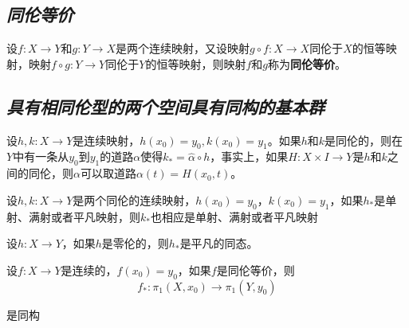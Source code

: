 \subsection*{\textsl{同伦等价}}


\begin{define}
    设$f:X\rightarrow Y$和$g:Y\rightarrow X$是两个连续映射，又设映射$g\circ f:X\rightarrow X$同伦于$X$的恒等映射，映射$f\circ g:Y\rightarrow Y$同伦于$Y$的恒等映射，则映射$f$和$g$称为\textbf{同伦等价}。
\end{define}

\subsection*{\textsl{具有相同伦型的两个空间具有同构的基本群}}

\begin{mdframed}
    \begin{lemma}
        设$h,k:X\rightarrow Y$是连续映射，$h(x_0)=y_0,k(x_0)=y_1$。如果$h$和$k$是同伦的，则在$Y$中有一条从$y_0$到$y_1$的道路$\alpha$使得$k_*=\hat{\alpha}\circ h$，事实上，如果$H:X\times I\rightarrow Y$是$h$和$k$之间的同伦，则$\alpha$可以取道路$\alpha(t)=H(x_0,t)$。
    \end{lemma}
\end{mdframed}

\begin{mdframed}
    \begin{corollary}
            设$h,k:X\rightarrow Y$是两个同伦的连续映射，$h(x_0)=y_0$，$k(x_0)=y_1$，如果$h_*$是单射、满射或者平凡映射，则$k_*$也相应是单射、满射或者平凡映射
    \end{corollary}
\end{mdframed}

\begin{mdframed}
    \begin{corollary}
        设$h:X\rightarrow Y$，如果$h$是零伦的，则$h_*$是平凡的同态。
    \end{corollary}
\end{mdframed}

\begin{mdframed}
    \begin{theorem}
        设$f:X\rightarrow Y$是连续的，$f(x_0)=y_0$，如果$f$是同伦等价，则
        \begin{equation}
            f_*:\pi_1(X,x_0)\rightarrow \pi_1(Y,y_0)
        \end{equation}

        是同构
    \end{theorem}
\end{mdframed}

